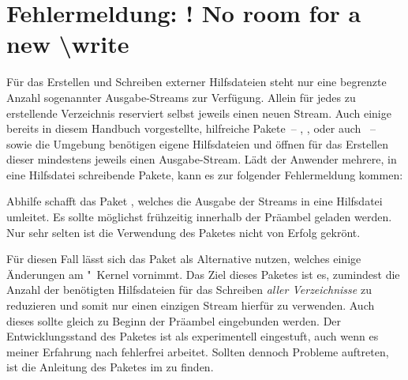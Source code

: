 \section{%
  Fehlermeldung: ! No room for a new \textbackslash write%
  \label{sec:tips:write}%
}
%
%
Für das Erstellen und Schreiben externer Hilfsdateien steht  nur 
eine begrenzte Anzahl sogenannter Ausgabe-Streams zur Verfügung. Allein für 
jedes zu erstellende Verzeichnis reserviert  selbst jeweils einen 
neuen Stream. Auch einige bereits in diesem Handbuch vorgestellte, hilfreiche 
Pakete~-- , ,  oder 
auch ~-- sowie die Umgebung 
benötigen eigene Hilfsdateien und öffnen für das Erstellen dieser mindestens 
jeweils einen Ausgabe-Stream. Lädt der Anwender mehrere, in eine Hilfsdatei 
schreibende Pakete, kann es zur folgender Fehlermeldung kommen:
%
\begin{quoting}
\end{quoting}
%
Abhilfe schafft das Paket , welches die Ausgabe der Streams 
in eine Hilfsdatei umleitet. Es sollte möglichst frühzeitig innerhalb der 
Präambel geladen werden. Nur sehr selten ist die Verwendung des Paketes nicht 
von Erfolg gekrönt. 

Für diesen Fall lässt sich das Paket  als Alternative nutzen, 
welches einige Änderungen am "~Kernel vornimmt. Das Ziel dieses 
Paketes ist es, zumindest die Anzahl der benötigten Hilfsdateien für das 
Schreiben \emph{aller Verzeichnisse} zu reduzieren und somit nur einen einzigen 
Stream hierfür zu verwenden. Auch dieses sollte gleich zu Beginn der Präambel 
eingebunden werden. Der Entwicklungsstand des Paketes ist als experimentell 
eingestuft, auch wenn es meiner Erfahrung nach fehlerfrei arbeitet. Sollten 
dennoch Probleme auftreten, ist die Anleitung des Paketes im \scrguide zu 
finden. 



